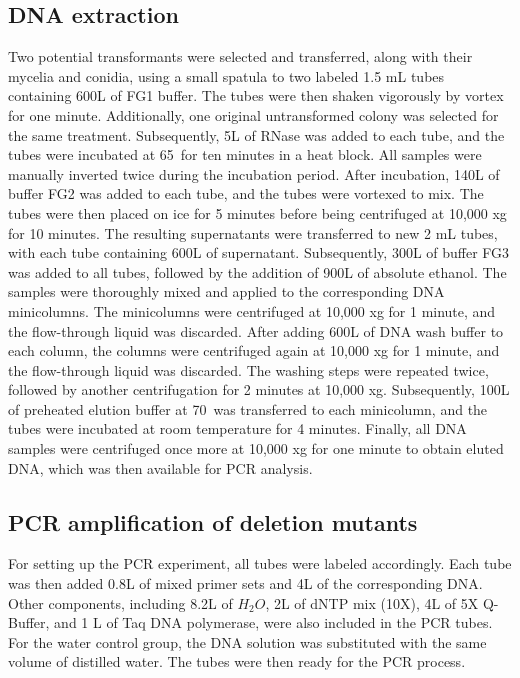 \documentclass[a4paper,10pt]{article}
\begin{document}
\begin{multicols}{2}
\subsection{DNA extraction}
Two potential transformants were selected and transferred, along with their mycelia and conidia, using a small spatula to two labeled 1.5 mL tubes containing 600\textmu L of FG1 buffer. The tubes were then shaken vigorously by vortex for one minute. Additionally, one original untransformed colony was selected for the same treatment. Subsequently, 5\textmu L of RNase was added to each tube, and the tubes were incubated at 65\textcelsius\ for ten minutes in a heat block. All samples were manually inverted twice during the incubation period. After incubation, 140\textmu L of buffer FG2 was added to each tube, and the tubes were vortexed to mix. The tubes were then placed on ice for 5 minutes before being centrifuged at 10,000 xg for 10 minutes. The resulting supernatants were transferred to new 2 mL tubes, with each tube containing 600\textmu L of supernatant. Subsequently, 300\textmu L of buffer FG3 was added to all tubes, followed by the addition of 900\textmu L of absolute ethanol. The samples were thoroughly mixed and applied to the corresponding DNA minicolumns. The minicolumns were centrifuged at 10,000 xg for 1 minute, and the flow-through liquid was discarded. After adding 600\textmu L of DNA wash buffer to each column, the columns were centrifuged again at 10,000 xg for 1 minute, and the flow-through liquid was discarded. The washing steps were repeated twice, followed by another centrifugation for 2 minutes at 10,000 xg. Subsequently, 100\textmu L of preheated elution buffer at 70\textcelsius\ was transferred to each minicolumn, and the tubes were incubated at room temperature for 4 minutes. Finally, all DNA samples were centrifuged once more at 10,000 xg for one minute to obtain eluted DNA, which was then available for PCR analysis.


\subsection{PCR amplification of deletion mutants}
For setting up the PCR experiment, all tubes were labeled accordingly. Each tube was then added 0.8\textmu L of mixed primer sets and 4\textmu L of the corresponding DNA. Other components, including 8.2\textmu L of $H_2O$, 2\textmu L of dNTP mix (10X), 4\textmu L of 5X Q-Buffer, and 1 \textmu L of Taq DNA polymerase, were also included in the PCR tubes. For the water control group, the DNA solution was substituted with the same volume of distilled water. The tubes were then ready for the PCR process.



\end{multicols}
\end{document}
